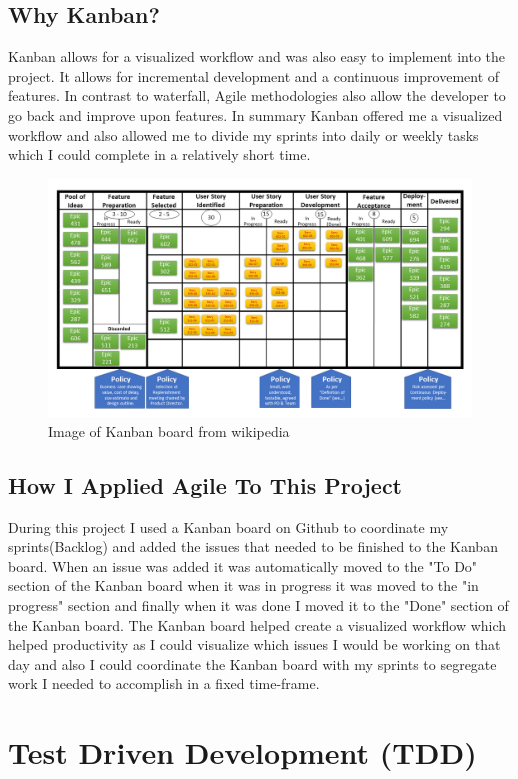 \subsection{Why Kanban?}
Kanban \cite{Kanban} allows for a visualized workflow and was also easy to implement into the project. It allows for incremental development and a continuous improvement of features.  In contrast to waterfall, Agile methodologies also allow the developer to go back and improve upon features.  In summary Kanban offered me a visualized workflow and also allowed me to divide my sprints into daily or weekly tasks which I could complete in a relatively short time.
\begin{figure}
\includegraphics[width=3\linewidth]{img/kanban.png}
\caption{Image of Kanban board from wikipedia}
\label{fig:Image of Kanban board}
\end{figure}
\subsection{How I Applied Agile To This Project}
During this project I used a Kanban board on Github \cite{KanbanBoard} to coordinate
my sprints(Backlog) and added the issues that needed to be finished to the Kanban board.   When an issue was added it was automatically moved to the "To Do" section of the Kanban board when it was in progress it was moved to the "in progress" section and finally when it was done I moved it to the "Done" section of the Kanban board.  The Kanban board helped create a visualized workflow which helped productivity as I could visualize which issues I would be working on that day and also I could coordinate
the Kanban board with my sprints to segregate work I needed to accomplish in a fixed
time-frame.
\section{Test Driven Development (TDD)}
